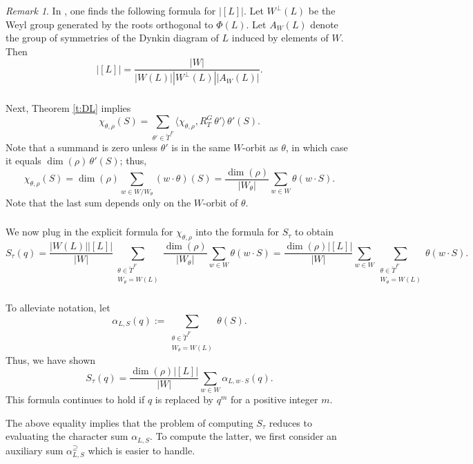\documentclass[12pt]{amsart}
\theoremstyle{plain}
\theoremstyle{definition}
\theoremstyle{remark}
\newtheorem{rem}[thm]{Remark}
\newcommand{\chT}{\check{T}}
\begin{document}
\begin{rem} 
In \cite[Proposition 28]{Carter72}, one finds the following formula for $|[L]|$. Let $W^\perp(L)$ be the Weyl group generated by the roots orthogonal to $\Phi(L)$.  Let $A_W(L)$ denote the group of symmetries of the Dynkin diagram of $L$ induced by elements of $W$. Then 
\[
|[L]|=\frac{|W|}{|W(L)||W^\perp(L)||A_W(L)|}. 
\]
\end{rem} 

\subsubsection{} Next, Theorem \ref{t:DL} implies 
\[
\displaystyle \chi_{\theta,\rho}(S) =   \sum_{\theta'\in \check{T}^F} \langle \chi_{\theta, \rho}, R_{T}^G \, \theta'\rangle \,\theta'(S).
\]
Note that a summand is zero unless $\theta'$ is in the same $W$-orbit as $\theta$, in which case it  equals $\dim(\rho)\, \theta'(S)$; thus, 
\[
\displaystyle \chi_{\theta,\rho}(S)  =
\dim(\rho) \sum_{w\in W/W_\theta}   (w\cdot \theta)(S)  = \frac{\dim(\rho)}{|W_\theta|} \sum_{w\in W}   \theta(w\cdot S).  
\]
Note that the last sum depends only on the $W$-orbit of $\theta$. 


\subsubsection{} We now plug in the explicit formula for $\chi_{\theta, \rho}$ into the formula for $S_\tau$ to obtain
\[
S_\tau(q) = 
\frac{|W(L)||[L]|}{|W|} \sum_{\substack{\theta\in \chT^F \\ W_\theta = W(L)}} \frac{\dim(\rho)}{|W_\theta|} \sum_{w\in W}   \theta(w\cdot S)
=\frac{\dim(\rho)|[L]|}{|W|}\sum_{w\in W}  \sum_{\substack{\theta\in \chT^F \\ W_\theta = W(L)}}     \theta(w\cdot S).
\]

\subsubsection{} To alleviate notation, let  
\[
\boxed{
\alpha_{L,S}(q):= \sum_{\substack{\theta\in \chT^F \\ W_\theta=W(L)}} \theta(S).} 
\]
Thus, we have shown 
\[
S_\tau(q)= \frac{\dim(\rho)|[L]|}{|W|} \sum_{w\in W} \alpha_{L,w\cdot S}(q).
\]
This formula continues to hold if $q$ is replaced by $q^m$ for a positive integer $m$. 

The above equality implies that the problem of computing $S_\tau$ reduces to evaluating the character sum $\alpha_{L,S}$. To compute the latter, we first consider an auxiliary sum $\alpha_{L,S}^\supseteq$ which is easier to handle. 
\end{document}
